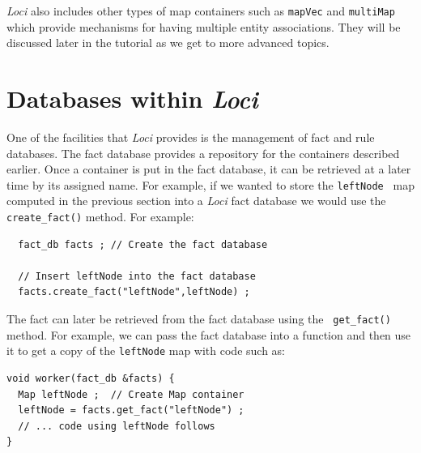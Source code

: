 \documentclass[10pt,epsf,letterpaper,twoside]{book}
\begin{document}
{\it Loci} also includes other types of map containers such as {\tt mapVec}
and {\tt multiMap} which provide mechanisms for having multiple entity
associations.  They will be discussed later in the tutorial as we get
to more advanced topics.

\section{Databases within {\it Loci}}

One of the facilities that {\it Loci} provides is the management of fact and
rule databases.  The fact database provides a repository for the
containers described earlier.  Once a container is put in the fact
database, it can be retrieved at a later time by its assigned name.  For example, if we wanted to store the {\tt leftNode } map computed in the previous section into a {\it Loci} fact database we would use the {\tt create\_fact()} method.  For example:
\begin{verbatim}
  fact_db facts ; // Create the fact database
  
  // Insert leftNode into the fact database
  facts.create_fact("leftNode",leftNode) ;
\end{verbatim}
The fact can later be retrieved from the fact database using the {\tt
get\_fact()} method.  For example, we can pass the fact database into
a function and then use it to get a copy of the {\tt leftNode} map
with code such as:
\begin{verbatim}
void worker(fact_db &facts) {
  Map leftNode ;  // Create Map container
  leftNode = facts.get_fact("leftNode") ;
  // ... code using leftNode follows
}
\end{verbatim}
\end{document}
